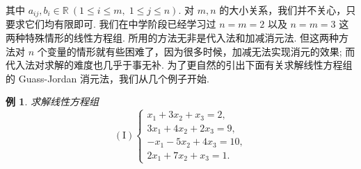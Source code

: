 \documentclass[10pt,openany]{article}
\theoremstyle{thmstyle} %
\theoremstyle{defstyle} %
\theoremstyle{prostyle} %
\theoremstyle{exastyle}
\newtheorem{example}[theorem]{例}
\theoremstyle{remstyle}
\begin{document}
其中 \( a_{ij}, b_i \in \mathbb{R} \ (1 \leq i \leq m,\; 1 \leq j \leq n) \). 对 \( m,n \) 的大小关系，我们并不关心，只要求它们均有限即可. 我们在中学阶段已经学习过 \( n=m=2 \) 以及 \( n=m=3 \) 这两种特殊情形的线性方程组. 所用的方法无非是代入法和加减消元法. 但这两种方法对 \( n \) 个变量的情形就有些困难了，因为很多时候，加减无法实现消元的效果; 而代入法对求解的难度也几乎于事无补. 为了更自然的引出下面有关求解线性方程组的 Guass-Jordan 消元法，我们从几个例子开始.

\begin{example}\label{1.1.1}
	求解线性方程组
	\[
	(\text{I}) \left\{
	\begin{array}{l}
		x_1 + 3x_2 + x_3 = 2, \\
		3x_1 + 4x_2 + 2x_3 = 9, \\
		-x_1 - 5x_2 + 4x_3 = 10, \\
		2x_1 + 7x_2 + x_3 = 1.
	\end{array}
	\right.
	\]
	
\end{example}
\end{document}
